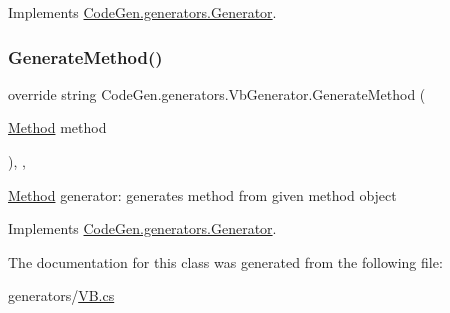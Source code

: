 Implements \mbox{\hyperlink{classCodeGen_1_1generators_1_1Generator_a0d1a48aedbca08c05af734a43739d1c3}{Code\+Gen.\+generators.\+Generator}}.

\mbox{\label{classCodeGen_1_1generators_1_1VbGenerator_ab8855feff4b8292c04a53362d270b34d}} 
\subsubsection{\texorpdfstring{Generate\+Method()}{GenerateMethod()}}
{\footnotesize\ttfamily override string Code\+Gen.\+generators.\+Vb\+Generator.\+Generate\+Method (\begin{DoxyParamCaption}\item[{\mbox{\hyperlink{classCodeGen_1_1generators_1_1Method}{Method}}}]{method }\end{DoxyParamCaption})\hspace{0.3cm}{\ttfamily [inline]}, {\ttfamily [protected]}, {\ttfamily [virtual]}}



\mbox{\hyperlink{classCodeGen_1_1generators_1_1Method}{Method}} generator\+: generates method from given method object  



Implements \mbox{\hyperlink{classCodeGen_1_1generators_1_1Generator_a04fc9bd217b3b8c3d5f7b1a3f92c79d3}{Code\+Gen.\+generators.\+Generator}}.



The documentation for this class was generated from the following file\+:\begin{DoxyCompactItemize}
\item 
generators/\mbox{\hyperlink{VB_8cs}{V\+B.\+cs}}\end{DoxyCompactItemize}
